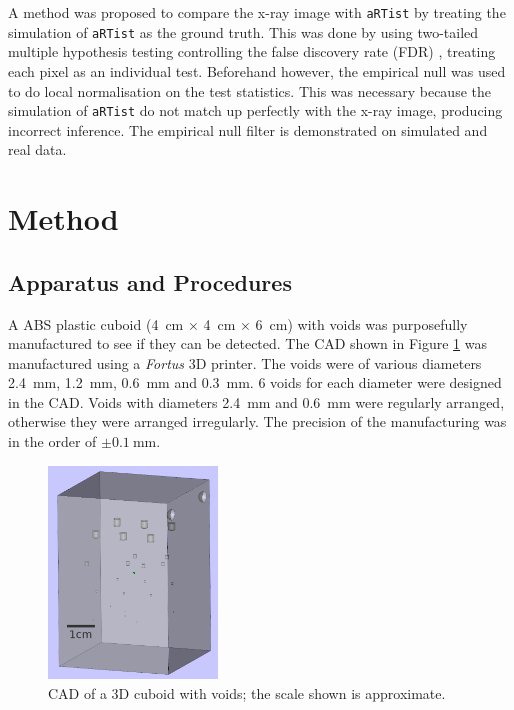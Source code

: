 \documentclass[twocolumn]{article}
\begin{document}
A method was proposed to compare the x-ray image with \texttt{aRTist} by treating the simulation of \texttt{aRTist} as the ground truth. This was done by using two-tailed multiple hypothesis testing \citep{pearson1900on, neyman1933on, fisher1970statistical} controlling the false discovery rate (FDR) \citep{benjamini1995controlling, benjamini2010discovering}, treating each pixel as an individual test. Beforehand however, the empirical null \citep{efron2004large} was used to do local normalisation on the test statistics. This was necessary because the simulation of \texttt{aRTist} do not match up perfectly with the x-ray image, producing incorrect inference. The empirical null filter is demonstrated on simulated and real data.

\section{Method}

\subsection{Apparatus and Procedures}

A ABS plastic cuboid (\SI{4}{\centi\metre} $\times$ \SI{4}{\centi\metre} $\times$ \SI{6}{\centi\metre}) with voids was purposefully manufactured to see if they can be detected. The CAD shown in Figure \ref{fig:inference_testObject} was manufactured using a \emph{Fortus} 3D printer. The voids were of various diameters \SI{2.4}{\milli\metre}, \SI{1.2}{\milli\metre}, \SI{0.6}{\milli\metre} and \SI{0.3}{\milli\metre}. 6 voids for each diameter were designed in the CAD. Voids with diameters \SI{2.4}{\milli\metre} and \SI{0.6}{\milli\metre} were regularly arranged, otherwise they were arranged irregularly. The precision of the manufacturing was in the order of $\pm\SI{0.1}{\milli\metre}$.

\begin{figure}[htp]
  \centering
  \includegraphics[width=0.4\textwidth]{../figures/inference/TestObject.png}
  \caption{CAD of a 3D cuboid with voids; the scale shown is approximate.}
  \label{fig:inference_testObject}
\end{figure}
\end{document}
